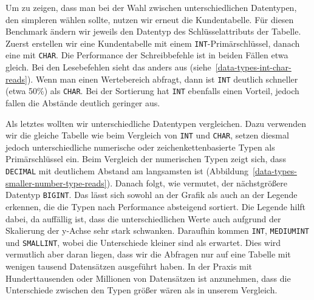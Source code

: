 Um zu zeigen, dass man bei der Wahl zwischen unterschiedlichen Datentypen, den simpleren wählen sollte, nutzen wir erneut die Kundentabelle.
Für diesen Benchmark ändern wir jeweils den Datentyp des Schlüsselattributs der Tabelle.
Zuerst erstellen wir eine Kundentabelle mit einem \texttt{INT}-Primärschlüssel, danach eine mit \texttt{CHAR}.
Die Performance der Schreibbefehle ist in beiden Fällen etwa gleich.
Bei den Lesebefehlen sieht das anders aus (siehe~\ref{data-types-int-char-reads}).
Wenn man einen Wertebereich abfragt, dann ist \texttt{INT} deutlich schneller (etwa 50\%) als \texttt{CHAR}.
Bei der Sortierung hat \texttt{INT} ebenfalls einen Vorteil, jedoch fallen die Abstände deutlich geringer aus.

Als letztes wollten wir unterschiedliche Datentypen vergleichen.
Dazu verwenden wir die gleiche Tabelle wie beim Vergleich von \texttt{INT} und \texttt{CHAR}, setzen diesmal jedoch unterschiedliche numerische oder zeichenkettenbasierte Typen als Primärschlüssel ein.
Beim Vergleich der numerischen Typen zeigt sich, dass \texttt{DECIMAL} mit deutlichem Abstand am langsamsten ist (Abbildung~\ref{data-types-smaller-number-type-reads}).
Danach folgt, wie vermutet, der nächstgrößere Datentyp \texttt{BIGINT}.
Das lässt sich sowohl an der Grafik als auch an der Legende erkennen, die die Typen nach Performance absteigend sortiert.
Die Legende hilft dabei, da auffällig ist, dass die unterschiedlichen Werte auch aufgrund der Skalierung der y-Achse sehr stark schwanken.
Daraufhin kommen \texttt{INT}, \texttt{MEDIUMINT} und \texttt{SMALLINT}, wobei die Unterschiede kleiner sind als erwartet.
Dies wird vermutlich aber daran liegen, dass wir die Abfragen nur auf eine Tabelle mit wenigen tausend Datensätzen ausgeführt haben.
In der Praxis mit Hunderttausenden oder Millionen von Datensätzen ist anzunehmen, dass die Unterschiede zwischen den Typen größer wären als in unserem Vergleich.

